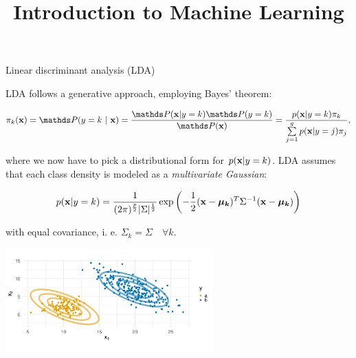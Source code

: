 \documentclass[11pt,compress,t,notes=noshow, xcolor=table]{beamer}
\title{Introduction to Machine Learning}
\begin{document}

\begin{vbframe}{Linear discriminant analysis (LDA)}

\begin{small}
LDA follows a generative approach, employing Bayes' theorem:

$$\pikx = \postk = \frac{\P(\xv | y = k) \P(y = k)}{\P(\xv)} = \frac{\pdfxyk \pik}{\sumjg \pdfxyk[j] \pi_j},$$

where we now have to pick a distributional form for $p(\mathbf{x} | y= k)$. LDA assumes that each class density is modeled as a \emph{multivariate Gaussian}:

$$
p(\mathbf{x} | y= k) = \frac{1}{(2\pi)^{\frac{p}{2}}|\Sigma|^{\frac{1}{2}}} \exp\left(-\frac{1}{2}(\mathbf{x} - \bm{\mu_{k}})^T \Sigma^{-1} (\mathbf{x} - \bm{\mu_{k}})\right)
$$

with equal covariance, i. e. $\Sigma_k = \Sigma \quad \forall k$.
\end{small}

\vspace{-0.9em}
\begin{center}
\includegraphics[width=0.60\textwidth, clip=true, trim={0 75 0 45}]{figure/disc_analysis-lda_1.png}
\end{center}
\end{vbframe}
\end{document}
